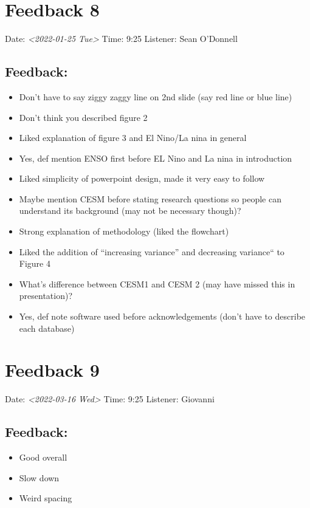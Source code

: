 \documentclass[little]{basic}
\begin{document}
\section{Feedback 8}
\label{sec:orgf10f8be}
Date: \textit{<2022-01-25 Tue>}
Time: 9:25
Listener: Sean O'Donnell
\subsection*{Feedback:}
\label{sec:orgd778e46}
\begin{itemize}
\item Don't have to say ziggy zaggy line on 2nd slide (say red line or blue line)
\item Don't think you described figure 2
\item Liked explanation of figure 3 and El Nino/La nina in general
\item Yes, def mention ENSO first before EL Nino and La nina in introduction
\item Liked simplicity of powerpoint design, made it very easy to follow
\item Maybe mention CESM before stating research questions so people can understand its background (may not be necessary though)?
\item Strong explanation of methodology (liked the flowchart)
\item Liked the addition of ``increasing variance'' and decreasing variance`` to Figure 4
\item What's difference between CESM1 and CESM 2 (may have missed this in presentation)?
\item Yes, def note software used before acknowledgements (don't have to describe each database)
\end{itemize}

\section{Feedback 9}
\label{sec:org9a0e673}
Date: \textit{<2022-03-16 Wed>}
Time: 9:25
Listener: Giovanni
\subsection*{Feedback:}
\label{sec:org0947ba6}
\begin{itemize}
\item Good overall
\item Slow down
\item Weird spacing
\end{itemize}
\end{document}
